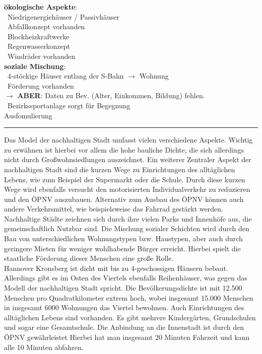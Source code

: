 \documentclass[12pt,a4paper]{report}
\newcommand{\psx}[0]{\color{green!100}{$(+)$}\color{black}\ }
\begin{document}
	\textbf{ökologische Aspekte}: \\
	\psx Niedrigenergiehäuser / Passivhäuser \\
	\psx Abfallkonzept vorhanden \\
	\psx Blockheizkraftwerke \\
	\psx Regenwasserkonzept \\
	\psx Windräder vorhanden 
	\\
	\textbf{soziale Mischung}: \\
	\psx 4-stöckige Häuser entlang der S-Bahn $\to$ Wohnung \\
	\psx Förderung vorhanden \\
	$\to$ \textbf{ABER}: Daten zu Bev. (Alter, Einkommen, Bildung) fehlen. \\
	\psx Bezirkssportanlage sorgt für Begegnung
	\\[0.5cm]
	\Large
	Ausfomulierung
	\hrule
	\vspace{0.25cm}
	\large
	\noindent
	Das Model der nachhaltigen Stadt umfasst vielen verschiedene Aspekte.
	Wichtig zu erwähnen ist hierbei vor allem die hohe bauliche Dichte, die sich allerdings nicht durch Großwohnsiedlungen auszeichnet.
	Ein weiterer Zentraler Aspekt der nachhaltigen Stadt sind die kurzen Wege zu Einrichtungen des alltäglichen Lebens, wie zum Beispiel der Supermarkt oder die Schule.
	Durch diese kurzen Wege wird ebenfalls versucht den motorisierten Individualverkehr zu reduzieren und den ÖPNV auszubauen.
	Alternativ zum Ausbau des ÖPNV können auch andere Verkehrsmittel, wie beispielsweise das Fahrrad gestärkt werden.
	Nachhaltige Städte zeichnen sich durch ihre vielen Parks und Innenhöfe aus, die gemeinschaftlich Nutzbar sind.
	Die Mischung sozialer Schichten wird durch den Bau von unterschiedlichen Wohnungstypen bzw. Haustypen, aber auch durch geringere Mieten für weniger wohlhabende Bürger erreicht.
	Hierbei spielt die staatliche Förderung dieser Menschen eine große Rolle. \\
	Hannover Kronsberg ist dicht mit bis zu 4-geschossigen Häusern bebaut.
	Allerdings gibt es im Osten des Viertels ebenfalls Reihenhäuser, was gegen das Modell der nachhaltigen Stadt spricht.
	Die Bevölkerungsdichte ist mit 12.500 Menschen pro Quadratkilometer extrem hoch, wobei insgesamt 15.000 Menschen in insgesamt 6000 Wohnungen das Viertel bewohnen.
	Auch Einrichtungen des alltäglichen Lebens sind vorhanden.
	Es gibt mehrere Kindergärten, Grundschulen und sogar eine Gesamtschule.
	Die Anbindung an die Innenstadt ist durch den ÖPNV gewährleistet
	Hierbei hat man insgesamt 20 Minuten Fahrzeit und kann alle 10 Minuten abfahren.
\end{document}
